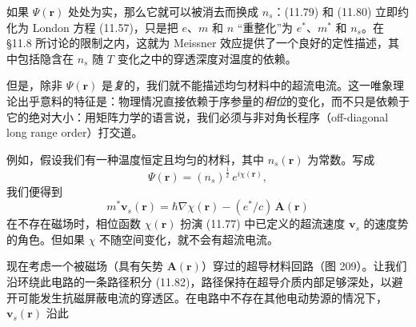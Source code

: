 如果 $\Psi(\mathbf{r})$ 处处为实，那么它就可以被消去而换成 $n_s$：(11.79) 和 (11.80) 立即约化为 London 方程 (11.57)，只是把 $e$、$m$ 和 $n$ “重整化”为 $e^{*}$、$m^{*}$ 和 $n_s$。在 §11.8 所讨论的限制之内，这就为 Meissner 效应提供了一个良好的定性描述，其中包括隐含在 $n_s$ 随 $T$ 变化之中的穿透深度对温度的依赖。

但是，除非 $\Psi(\mathbf{r})$ 是\emph{复}的，我们就不能描述均匀材料中的超流电流。这一唯象理论出乎意料的特征是：物理情况直接依赖于序参量的\emph{相位}的变化，而不只是依赖于它的绝对大小：用矩阵力学的语言说，我们必须与非对角长程序（off-diagonal long range order）打交道。

例如，假设我们有一种温度恒定且均匀的材料，其中 $n_s(\mathbf{r})$ 为常数。写成
\begin{equation*}
\Psi(\mathbf{r}) = (n_s)^{\frac{1}{2}}\,e^{i\chi(\mathbf{r})}, \tag{11.81}
\end{equation*}
我们便得到
\begin{equation*}
m^{*}\mathbf{v}_s(\mathbf{r}) = \hbar\nabla\chi(\mathbf{r}) - (e^{*}/c)\,\mathbf{A}(\mathbf{r}) \tag{11.82}
\end{equation*}
在不存在磁场时，相位函数 $\chi(\mathbf{r})$ 扮演 (11.77) 中已定义的超流速度 $\mathbf{v}_s$ 的速度势的角色。但如果 $\chi$ 不随空间变化，就不会有超流电流。


现在考虑一个被磁场（具有矢势 $\mathbf{A}(\mathbf{r})$）穿过的超导材料回路（图 209）。让我们沿环绕此电路的一条路径积分 (11.82)，路径保持在超导介质内部足够深处，以避开可能发生抗磁屏蔽电流的穿透区。在电路中不存在其他电动势源的情况下，$\mathbf{v}_s(\mathbf{r})$ 沿此

